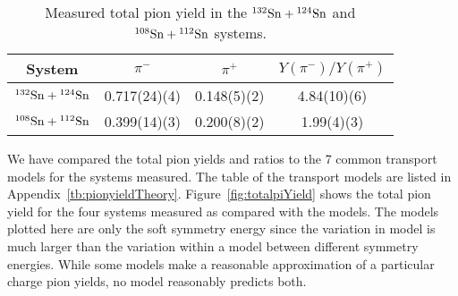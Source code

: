 

\begin{table*}\centering
{}
\begin{tabular}{@{}cccc@{}}\toprule
System & $\pi^-$ & $\pi^+$ & $Y(\pi^-)/Y(\pi^+)$  \\
\midrule
${}^{132}\mathrm{Sn} + {}^{124}\mathrm{Sn}$ & 0.717(24)(4) & 0.148(5)(2) & 4.84(10)(6)  \\
${}^{108}\mathrm{Sn} + {}^{112}\mathrm{Sn}$ & 0.399(14)(3) & 0.200(8)(2) & 1.99(4)(3)  \\
\bottomrule
\end{tabular}
\caption{Measured total pion yield in the ${}^{132}\mathrm{Sn} + {}^{124}\mathrm{Sn}$ and ${}^{108}\mathrm{Sn} + {}^{112}\mathrm{Sn}$ systems.}
\label{tb:pionyield}
\end{table*}


We have compared the total pion yields and ratios to the 7 common transport models for the systems measured. The table of the transport models are listed in Appendix~\ref{tb:pionyieldTheory}. Figure~\ref{fig:totalpiYield} shows the total pion yield for the four systems measured as compared with the models. The models plotted here are only the soft symmetry energy since the variation in model is much larger than the variation within a model between different symmetry energies. While some models make a reasonable approximation of a particular charge pion yields, no model reasonably predicts both. 


